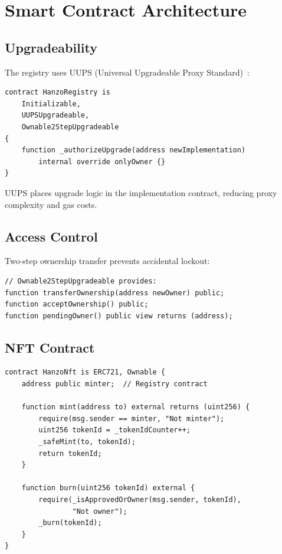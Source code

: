 \documentclass[11pt,twocolumn]{article}
\begin{document}
\section{Smart Contract Architecture}

\subsection{Upgradeability}

The registry uses UUPS (Universal Upgradeable Proxy Standard)~\cite{eip1822}:

\begin{lstlisting}[language=Solidity]
contract HanzoRegistry is
    Initializable,
    UUPSUpgradeable,
    Ownable2StepUpgradeable
{
    function _authorizeUpgrade(address newImplementation)
        internal override onlyOwner {}
}
\end{lstlisting}

UUPS places upgrade logic in the implementation contract, reducing proxy complexity and gas costs.

\subsection{Access Control}

Two-step ownership transfer prevents accidental lockout:

\begin{lstlisting}[language=Solidity]
// Ownable2StepUpgradeable provides:
function transferOwnership(address newOwner) public;
function acceptOwnership() public;
function pendingOwner() public view returns (address);
\end{lstlisting}

\subsection{NFT Contract}

\begin{lstlisting}[language=Solidity]
contract HanzoNft is ERC721, Ownable {
    address public minter;  // Registry contract

    function mint(address to) external returns (uint256) {
        require(msg.sender == minter, "Not minter");
        uint256 tokenId = _tokenIdCounter++;
        _safeMint(to, tokenId);
        return tokenId;
    }

    function burn(uint256 tokenId) external {
        require(_isApprovedOrOwner(msg.sender, tokenId),
                "Not owner");
        _burn(tokenId);
    }
}
\end{lstlisting}
\end{document}
